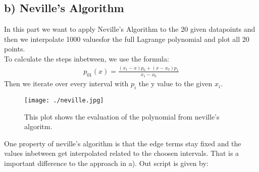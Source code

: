 \subsection*{b) Neville's Algorithm}
In this part we want to apply Neville's Algorithm to the 20 given datapoints and then we interpolate 1000 valuesfor the full Lagrange polynomial and plot all 20 points. \\
To calculate the steps inbetween, we use the formula:
\begin{align}
    p_{01}(x) = \frac{(x_1 - x) p_0 + (x-x_0)p_1}{x_1-x_0}
\end{align}
Then we iterate over every interval with $p_i$ the y value to the given $x_i$.\\
\begin{figure}
    \centering
    \texttt{[image: ./neville.jpg]}
    \caption{This plot shows the evaluation of the polynomial from neville's algoritm. }
    \label{fig:enter-label}
\end{figure}
One property of neville's algorithm is that the edge terms stay fixed and the values inbetween get interpolated related to the choosen intervals. That is a important difference to the approach in a). 
Out script is given by:


